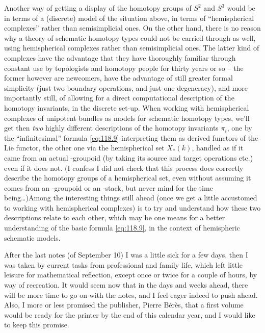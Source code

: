Another way of getting a display of the homotopy groups of $S^2$ and
$S^3$ would be in terms of a (discrete) model of the situation above,
in terms of ``hemispherical complexes'' rather than semisimplicial
ones. On the other hand, there is no reason why a theory of schematic
homotopy types could not be carried through as well, using
hemispherical complexes rather than semisimplicial ones. The latter
kind of complexes have the advantage that they have
 thoroughly familiar through constant use
by topologists and homotopy people for thirty years or so -- the
former however are newcomers, have the advantage of still greater
formal simplicity (just two boundary operations, and just one
degeneracy), and more importantly still, of allowing for a direct
computational description of the homotopy invariants, in the discrete
set-up. When working with hemispherical complexes of unipotent bundles
as models for schematic homotopy types, we'll get then \emph{two}
highly different descriptions of the homotopy invariants $\pi_i$, one
by the ``infinitesimal'' formula \eqref{eq:118.9} interpreting them as
derived functors of the Lie functor, the other one via the
hemispherical set $X_*(k)$, handled as if it came from an actual
\oo-groupoid (by taking its source and target operations etc.) even if
it does not. (I confess I did not check that this process does
correctly describe the homotopy groups of a hemispherical set, even
without assuming it comes from an \oo-groupoid or an \oo-stack, but
never mind for the time being\dots)\enspace Among the interesting
things still ahead (once we get a little accustomed to working with
hemispherical complexes) is to try and understand how these two
descriptions relate to each other, which may be one means for a better
understanding of the basic formula \eqref{eq:118.9}, in the context of
hemispheric schematic models.

\bigbreak

\noindent\hfill{}\par

\label{sec:119}%
After the last notes (of September 10) I was a little sick for a few
days, then I was taken by current tasks from professional and family
life, which left little leisure for mathematical reflection, except
once or twice for a couple of hours, by way of recreation. It would
seem now that in the days and weeks ahead, there will be more time to
go on with the notes, and I feel eager indeed to push ahead. Also, I
more or less promised the publisher, Pierre Bérès, that a first volume
would be ready for the printer by the end of this calendar year, and I
would like to keep this promise.


